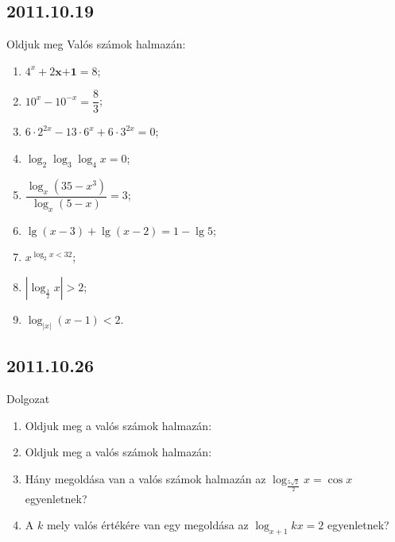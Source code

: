 \subsection*{2011.10.19}
Oldjuk meg Valós számok halmazán:
\begin{enumerate}
		\item $4^{x}+2\textbf{x+1}=8$;
        \item $10^{x}-10^{-x}=\dfrac{8}{3}$;
        \item $6\cdot2^{2x}-13\cdot6^{x}+6\cdot3^{2x}=0$;
        \item $\log_{2}\log_{3}\log_{4}x=0$;
        \item $\dfrac{\log_{x}(35-x^{3})}{\log_{x}(5-x)}=3$;
        \item $\lg(x-3)+\lg(x-2)=1-\lg5$;
        \item $x^{\log_{2}x<32}$;
        \item $|\log_{\frac{1}{2}}x|>2$;
        \item $\log_{|x|}(x-1)<2$.
\end{enumerate}


\subsection*{2011.10.26}Dolgozat

\begin{enumerate}
		\item Oldjuk meg a valós számok halmazán:
        \item Oldjuk meg a valós számok halmazán:
        \item Hány megoldása van a valós számok halmazán az $\log_{\frac{5\sqrt{2}}{2}}x=\cos x$ egyenletnek?
        \item A $k$ mely valós értékére van egy megoldása az $\log_{x+1}kx=2$ egyenletnek?
\end{enumerate}



